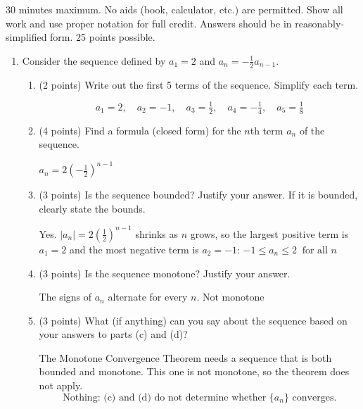 \documentclass[12pt]{article}
\newcommand{\ds}{\displaystyle}
\begin{document}
30 minutes maximum.  No aids (book, calculator, etc.) are permitted.
Show all work and use proper notation for full credit.  Answers should
be in reasonably-simplified form.  25 points possible.

\begin{enumerate}


  \item Consider the sequence defined by $a_1 = 2$ and $\ds a_n =
    -\frac{1}{2} a_{n-1}$.
    \begin{enumerate}
    \item (2 points) Write out the first 5 terms of the sequence. Simplify each
      term.
      \begin{solution}
        \[
          \boxed{a_1 = 2,\quad a_2 = -1,\quad a_3 = \tfrac12,\quad a_4 = -\tfrac14,\quad a_5 = \tfrac18}
        \]
      \end{solution}
      \vfill

    \item (4 points) Find a formula (closed form) for the $n$th term $a_n$ of
      the sequence.
      \begin{solution}
        $\ds\boxed{a_n = 2\left(-\frac12\right)^{n-1}}$
      \end{solution}
      \vfill

    \item (3 points) Is the sequence bounded? Justify your answer. If it is
      bounded, clearly state the bounds.
      \begin{solution}
        Yes. $|a_n| = 2\left(\frac12\right)^{n-1}$ shrinks as $n$ grows, so the largest
        positive term is $a_1 = 2$ and the most negative term is $a_2 = -1$:\quad
        $\boxed{-1 \le a_n \le 2 \ \text{ for all } n}$
      \end{solution}
      \vfill

    \item (3 points) Is the sequence monotone? Justify your answer.
      \begin{solution}
        The signs of $a_n$ alternate for every $n$.\quad
        $\boxed{\text{Not monotone}}$
      \end{solution}
      \vfill

    \item (3 points) What (if anything) can you say about the sequence
      based on your answers to
      parts (c) and (d)?
      \begin{solution}
        The Monotone Convergence Theorem needs a sequence that is both bounded and monotone.
        This one is not monotone, so the theorem does not apply.
        \[
          \boxed{\text{Nothing: (c) and (d) do not determine whether } \{a_n\} \text{ converges.}}
        \]
      \end{solution}
      \vfill
      

\end{enumerate}
\end{enumerate}
\end{document}
